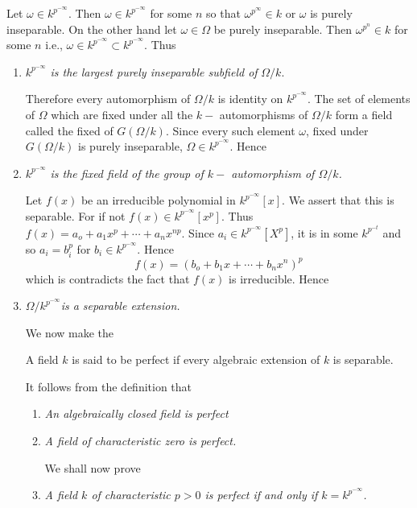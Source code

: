 Let $\omega \in k^{ p^{-\infty}}$. Then $\omega \in k^{ p^{-\infty}}$ for some
$n$ so that $\omega^{ p^\infty} \in k $ or $\omega$ is purely
inseparable. On the other hand let $\omega \in \Omega$ be purely
inseparable. Then $\omega^{ p^n} \in k$  for some $n$ i.e., $\omega
\in k^{ p^{-\infty}} \subset k^{ p^{-\infty}}$. Thus  
\begin{enumerate}[1)]
\item $k^{ p^{-\infty}}$ \textit{ is the largest purely inseparable
  subfield of } $\Omega / k$. 

Therefore every automorphism of  $\Omega / k$ is identity on $k^{
  p^{-\infty}}$. The set of elements of $\Omega$ which are fixed under all
the $k-$ automorphisms of $\Omega /k$ form a field called the fixed of
$G( \Omega / k)$. Since every such element $\omega$, fixed under
$G(\Omega / k)$ is purely inseparable, $\Omega \in k^{
  p^{-\infty}}$. Hence  

\item $k^{ p^{-\infty}}$ \textit{is the fixed field of the group of $k-$
  automorphism of $\Omega /k$.}  

Let $f(x)$ be an irreducible polynomial in $k^{ p^{-\infty }}[x]$. We
assert that this is separable. For if not $f(x) \in k^{
  p^{-\infty}}[x^p]$. Thus $f(x) = a_o + a_1 x^p + \cdots + a_n
x^{np}$. Since $a_i \in k^{ p^{-\infty }} [X^p]$, it is in some $k^{
  p^{-t }}$ and so $a_i = b_i^p$ for $ b_i \in k^{ p^{-\infty
}}$. Hence  
$$
f(x) = (b_o + b_1 x + \cdots + b_n x^n)^p
$$
which is contradicts the fact that $f(x)$ is irreducible. Hence 

\item $\Omega /k^{ p^{-\infty }}$\pageoriginale \textit{is a separable extension.}

We now make the 

\begin{defi*}%
A field $k$ is said to be perfect if every algebraic extension
  of $k$ is separable.  
\end{defi*}

It follows from the definition that
\begin{enumerate} [1)]
\item \textit{ An  algebraically closed field is perfect }
\item \textit{ A field of characteristic zero is perfect. }

We shall now prove

\item \textit{ A field $k$ of characteristic $p > 0$ is perfect if and
  only if $k = k^{ p^{-\infty }}$.} 


\end{enumerate}
\end{enumerate}
